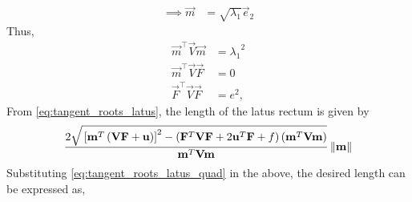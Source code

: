 \documentclass[journal,12pt,twocolumn]{IEEEtran}
\renewcommand\thesection{\arabic{section}}
\renewcommand\thesubsection{\thesection.\arabic{subsection}}
\begin{document}
\begin{enumerate}[label=\thesubsection.\arabic*.,ref=\thesubsection.\theenumi]
\begin{align}
	\implies\vec{m} &=  \sqrt{\lambda_1}\vec{e}_2
\end{align}
Thus, 
\begin{align}
	\vec{m}^{\top}\vec{V}\vec{m} &= {\lambda_1}^2
	\\
	\vec{m}^{\top}\vec{V}\vec{F} &= 0
	\\
	\vec{F}^{\top}\vec{V}\vec{F} &=e^2 
\label{eq:tangent_roots_latus_quad},
\end{align}
From 
\eqref{eq:tangent_roots_latus},
the length of the latus rectum is given by 
{\tiny
\begin{multline}
 \frac{2\sqrt{
{}\left[
\mathbf{m}^T\left(\mathbf{V}\mathbf{F}+\mathbf{u}\right)
\right]^2
-
\left(
\mathbf{F}^T\mathbf{V}\mathbf{F} + 2\mathbf{u}^T\mathbf{F} +f
\right)
\left(\mathbf{m}^T\mathbf{V}\mathbf{m}\right)
}
}
{
\mathbf{m}^T\mathbf{V}\mathbf{m}
}\left\lVert\mathbf{m}\right\rVert
\end{multline}
}
Substituting \eqref{eq:tangent_roots_latus_quad} in the above, the desired length can be expressed as,



\end{enumerate}
\end{document}
